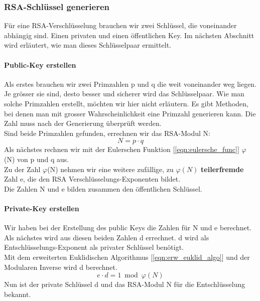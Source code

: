 \subsubsection{RSA-Schlüssel generieren}
Für eine RSA-Verschlüsselung brauchen wir zwei Schlüssel, die voneinander abhängig sind. Einen privaten und einen öffentlichen Key. Im nächsten Abschnitt wird erläutert, wie man dieses Schlüsselpaar ermittelt.%
%
\paragraph{Public-Key erstellen}\label{sec:public_key}
Als erstes brauchen wir zwei Primzahlen p und q die weit voneinander weg liegen. Je grösser sie sind, desto besser und sicherer wird das Schlüsselpaar. Wie man solche Primzahlen erstellt, möchten wir hier nicht erläutern. Es gibt Methoden, bei denen man mit grosser Wahrscheinlichkeit eine Primzahl generieren kann. Die Zahl muss nach der Generierung überprüft werden.\\
Sind beide Primzahlen gefunden, errechnen wir das RSA-Modul N: %
%
\begin{equation}
  N = p \cdot q
  \label{eqn:rsa_modul}
\end{equation}
%
Als nächstes rechnen wir mit der Eulerschen Funktion [\ref{eqn:eulersche_func}] $\varphi$(N) von p und q aus.\\
Zu der Zahl $\varphi$(N) nehmen wir eine weitere zufällige, zu $\varphi(N)$ \textbf{teilerfremde} Zahl e, die den RSA Verschlüsselungs-Exponenten bildet.\\
Die Zahlen N und e bilden zusammen den öffentlichen Schlüssel.
\paragraph{Private-Key erstellen}
Wir haben bei der Erstellung des public Keys die Zahlen für N und e berechnet. Als nächstes wird aus diesen beiden Zahlen d errechnet. d wird als Entschlüsselungs-Exponent als privater Schlüssel benötigt.\\
Mit dem erweiterten Euklidischen Algorithmus [\ref{eqn:erw_euklid_algo}] und der Modularen Inverse wird d berechnet.\\
\begin{equation}
	e \cdot d = 1 \bmod{ \varphi(N) } 
	\label{eqn:rsa_private_key_erstellen}
\end{equation}
%
%
%
Nun ist der private Schlüssel d und das RSA-Modul N für die Entschlüsselung bekannt.
